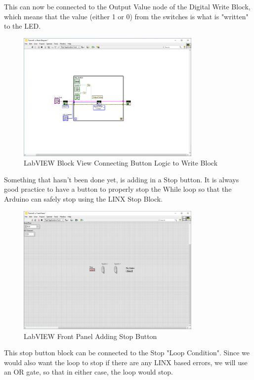 \documentclass[a4paper,11pt]{report}
\begin{document}
This can now be connected to the Output Value node of the Digital Write Block, which means that the value (either 1 or 0) from the switches is what is "written" to the LED.

\begin{figure}[H]
\centering
\includegraphics[width=0.8\textwidth]{screenshots/labview26}
\caption{LabVIEW Block View Connecting Button Logic to Write Block}
\end{figure}

Something that hasn't been done yet, is adding in a Stop button. It is always good practice to have a button to properly stop the While loop so that the Arduino can safely stop using the LINX Stop Block.

\begin{figure}[H]
\centering
\includegraphics[width=0.8\textwidth]{screenshots/labview27}
\caption{LabVIEW Front Panel Adding Stop Button}
\end{figure}

This stop button block can be connected to the Stop "Loop Condition". Since we would also want the loop to stop if there are any LINX based errors, we will use an OR gate, so that in either case, the loop would stop.
\end{document}

